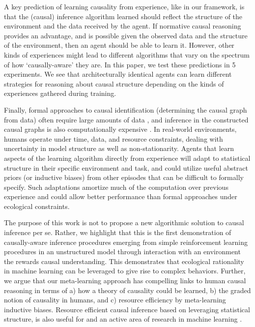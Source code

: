 A key prediction of learning causality from experience, like in our framework, is that the (causal) inference algorithm learned should reflect the structure of the environment and the data received by the agent. If normative causal reasoning provides an advantage, and is possible given the observed data and the structure of the environment, then an agent should be able to learn it. However, other kinds of experiences might lead to different algorithms that vary on the spectrum of how `causally-aware' they are. In this paper, we test these predictions in 5 experiments. We see that architecturally identical agents can learn different strategies for reasoning about causal structure depending on the kinds of experiences gathered during training. 

Finally, formal approaches to causal identification (determining the causal graph from data) often require large amounts of data \citep{geiger1990identifying,spirtes2000causation,verma1991equivalence}, and inference in the constructed causal graphs is also computationally expensive \citep{jordan2002graphical}. In real-world environments, humans operate under time, data, and resource constraints, dealing with uncertainty in model structure as well as non-stationarity. Agents that learn aspects of the learning algorithm directly from experience will adapt to statistical structure in their specific environment and task, and could utilize useful abstract priors (or inductive biases) from other episodes that can be difficult to formally specify. Such adaptations amortize much of the computation over previous experience and could allow better performance than formal approaches under ecological constraints\citep{Dasgupta644534,gershman2015computational,gigerenzer2009homo,lieder2017strategy,todd2007environments}.  

The purpose of this work is not to propose a new algorithmic solution to causal inference per se. Rather, we highlight that this is the first demonstration of causally-aware inference procedures emerging from simple reinforcement learning procedures in an unstructured model through interaction with an environment the rewards causal understanding. This demonstrates that ecological rationality in machine learning can be leveraged to give rise to complex behaviors. Further, we argue that our meta-learning approach has compelling links to human causal reasoning in terms of a) how a theory of causality could be learned, b) the graded notion of causality in humans, and c) resource efficiency by meta-learning inductive biases. Resource efficient causal inference based on leveraging statistical structure, is also useful for and an active area of research in machine learning \citep[e.g.][]{bengio2019meta, heckerman1995learning,magliacane2018domain,parascandolo2017learning,mitrovic2018causal}.

